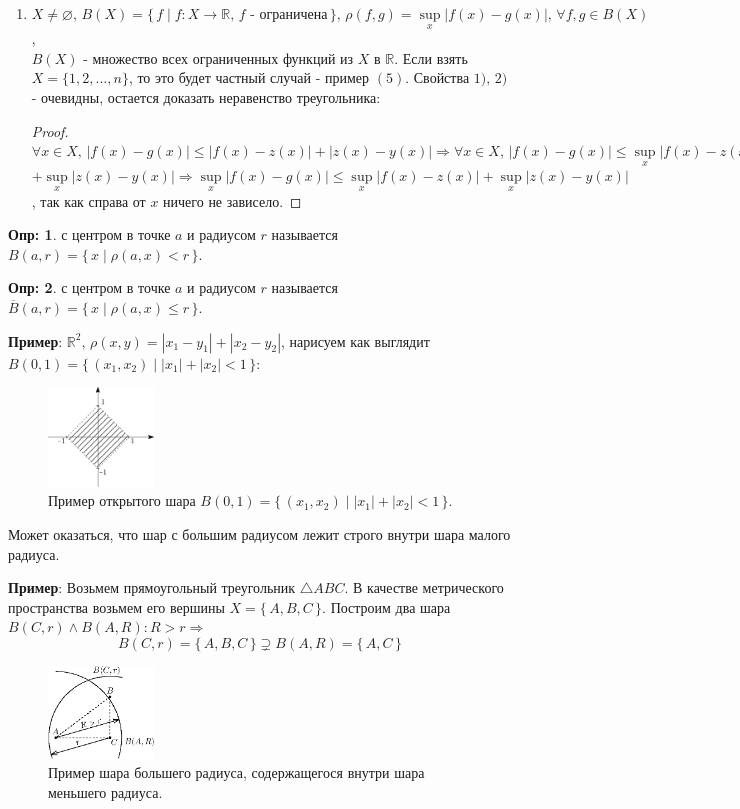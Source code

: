 \documentclass[12pt]{article}
\newcommand{\MR}{\mathbb{R}}
\newcommand{\VN}{\varnothing}
\theoremstyle{definition}
\newtheorem{defn}{Опр:}
\begin{document}
\begin{enumerate}[label={(\arabic*)}]
	\item $X \neq \VN, \, B(X) = \{\, f \mid f\colon X \to \MR, \, f \text{ - ограничена}\,\}, \, \rho(f,g) = \sup\limits_{x}|f(x) - g(x)|,\, \forall f,g \in B(X)$,\\  $B(X)$ - множество всех ограниченных функций из $X$ в $\MR$. Если взять $X = \{1,2, \dotsc, n\}$, то это будет частный случай - пример $(5)$. Свойства $1), \, 2)$ - очевидны, остается доказать неравенство треугольника:
	\begin{proof}
		$\forall x \in X,\, |f(x) - g(x)| \leq |f(x) - z(x)| + |z(x) - y(x)| \Rightarrow  \forall x \in X,\, |f(x) - g(x)| \leq \sup\limits_{x}|f(x) - z(x)| +$\\
		$ + \sup\limits_{x}|z(x) - y(x)| \Rightarrow \sup\limits_{x}|f(x) - g(x)| \leq \sup\limits_{x}|f(x) - z(x)| + \sup\limits_{x}|z(x) - y(x)|$, так как справа от $x$ ничего не зависело.
	\end{proof} 
\end{enumerate}

\begin{defn}
	 с центром в точке $a$ и радиусом $r$ называется $B(a,r) = \{\, x \mid \rho(a,x) < r \, \}$.
\end{defn}
\begin{defn}
	 с центром в точке $a$ и радиусом $r$ называется $\overline{B}(a,r) = \{\, x \mid \rho(a,x) \leq r \, \}$.
\end{defn}

\textbf{Пример}: $\MR^2,\, \rho(x,y) = |x_1 - y_1| + |x_2 - y_2|$, нарисуем как выглядит $B(0,1) = \{\,(x_1,x_2) \mid |x_1| + |x_2| < 1 \,\}$:
\begin{figure}[H]
	\centering
	\includegraphics[width=0.25\textwidth]{3_2.png}
	\caption{Пример открытого шара $B(0,1) = \{\,(x_1,x_2) \mid |x_1| + |x_2| < 1 \,\}$.}
	\label{3_2}
\end{figure}

Может оказаться, что шар с большим радиусом лежит строго внутри шара малого радиуса.

\textbf{Пример}: Возьмем прямоугольный треугольник $\triangle ABC$. В качестве метрического пространства возьмем его вершины $X = \{\,A, B, C \,\}$. Построим два шара $B(C,r) \wedge B(A,R) \colon R > r \Rightarrow$ 
$$B(C,r) =  \{\,A, B, C \,\} \supsetneq B(A,R) =  \{\,A, C \,\}$$
\begin{figure}[H]
	\centering
	\includegraphics[width=0.25\textwidth]{3_3.eps}
	\caption{Пример шара большего радиуса, содержащегося внутри шара меньшего радиуса.}
	\label{3_3}
\end{figure}
\end{document}
